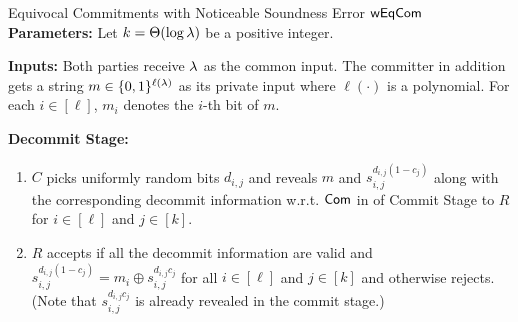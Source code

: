 \begin{ProtocolBox}[label={protocol:wEqCom}]{Equivocal Commitments with Noticeable Soundness Error $\mathsf{wEqCom}$}
{\bf Parameters:} Let $k=\Theta(\log \lambda)$ be a positive integer.

{\bf Inputs:} Both parties receive $\lambda$ as the common input. The committer in addition gets a string $m\in \{0,1\}^{\ell(\lambda)}$ as its private input where $\ell(\cdot)$ is a polynomial.
For each $i\in [\ell]$, $m_i$ denotes the $i$-th bit of $m$.  



{\bf Decommit Stage:} 
\begin{enumerate}
\item $C$ picks uniformly random bits $d_{i,j}$ and reveals $m$ and 
$s_{i,j}^{d_{i,j}(1-c_j)}$ along with the corresponding decommit information w.r.t. $\mathsf{Com}$ in  of Commit Stage to $R$ for $i\in [\ell]$ and $j\in [k]$. 
\item  $R$ accepts if all the decommit information are valid and $s_{i,j}^{d_{i,j}(1-c_j)}=m_i\oplus s_{i,j}^{d_{i,j}c_j}$ for all  $i\in [\ell]$ and $j\in [k]$ and otherwise rejects. (Note that $s_{i,j}^{d_{i,j}c_j}$ is already revealed in the commit stage.)
\end{enumerate}
\end{ProtocolBox}
